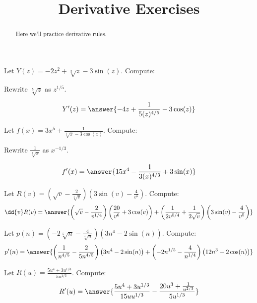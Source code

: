 \documentclass[handout]{ximera}
\title{Derivative Exercises}
\begin{document}
\begin{abstract}
  Here we'll practice derivative rules.
\end{abstract}
\maketitle

\begin{exercise}
Let $Y(z) = -2 z^2 + \sqrt[5]{z} -3 \sin (z)$. Compute:

\begin{hint}
Rewrite $\sqrt[5]{z}$ as $z^{1/5}$.
\end{hint}

\[
Y'(z)
=\answer{-4z+\frac{1}{5 (z)^{4/5}}-3 \cos(z)}
\]
\end{exercise}


\begin{exercise}
Let $f(x) = 3x^5+\frac{1}{\sqrt[3]{x}-3 \cos (x)}$. Compute:

\begin{hint}
Rewrite $\frac{1}{\sqrt[3]{x}}$ as $x^{-1/3}$.
\end{hint}
\[
f'(x)
=\answer{15x^4-\frac{1}{3 (x)^{4/3}}+3 \sin(x)}
\]
\end{exercise}

\begin{exercise}
Let $R(v) = \left(\sqrt{v}-\frac{2}{\sqrt[4]{v}}\right) \left(3 \sin (v)-\frac{4}{v^5}\right)$. Compute:
\[
\dd{v}R(v)
=\answer{\left(\sqrt{v}-\frac{2}{{v}^{1/4}}\right) \left(\frac{20}{v^6}+3 \cos (v)\right) + \left(\frac{1}{2 {v}^{5/4}}+\frac{1}{2 \sqrt{v}}\right) \left(3 \sin (v)-\frac{4}{v^5}\right)}
\]
\end{exercise}

\begin{exercise}
Let $p(n) = \left(-2 \sqrt[5]{n}-\frac{4}{\sqrt[4]{n}}\right) \left(3 n^4-2 \sin (n)\right)$. Compute:
\[
p'(n)
=\answer{\left(\frac{1}{{n}^{4/5}}-\frac{2}{5 {n}^{4/5}}\right) \left(3 n^4 - 2 \sin (n)\right)+\left(-2 {n}^{1/5}-\frac{4}{{n}^{1/4}}\right) \left(12 n^3 - 2 \cos (n)\right)}
\]
\end{exercise}

\begin{exercise}
Let $R(u) = \frac{5 u^4+3 {u}^{1/3}}{-5 {u}^{1/3}}$. Compute:
\[
R'(u)
=\answer{\frac{5 u^4 + 3 {u}^{1/3}}{15 u {u}^{1/3}}-\frac{20 u^3+\frac{1}{{u}^{2/3}}}{5 {u}^{1/3}}}
\]
\end{exercise}
\end{document}
